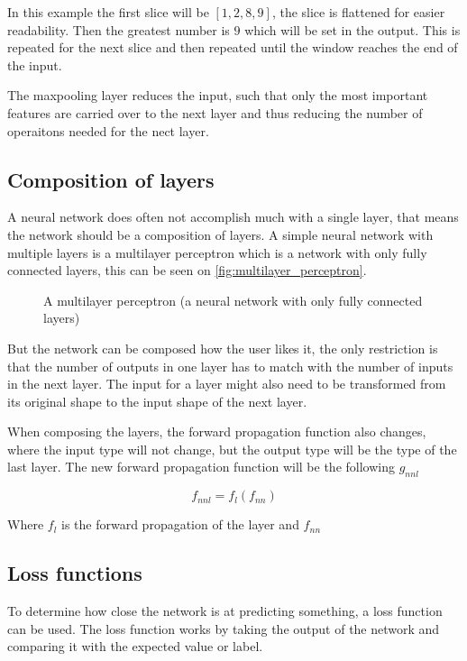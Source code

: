In this example the first slice will be $[1, 2, 8, 9]$, the slice is flattened for easier readability. Then the greatest number is $9$ which will be set in the output. This is repeated for the next slice and then repeated until the window reaches the end of the input.

The maxpooling layer reduces the input, such that only the most important features are carried over to the next layer and thus reducing the number of operaitons needed for the nect layer.

\subsection{Composition of layers}%
\label{sub:Composition}

A neural network does often not accomplish much with a single layer, that means the network should be a composition of layers. A simple neural network with multiple layers is a multilayer perceptron which is a network with only fully connected layers, this can be seen on \autoref{fig:multilayer_perceptron}.

\begin{figure}
    \caption{A multilayer perceptron (a neural network with only fully connected layers)}
    \label{fig:multilayer_perceptron}
\end{figure}

But the network can be composed how the user likes it, the only restriction is that the number of outputs in one layer has to match with the number of inputs in the next layer. The input for a layer might also need to be transformed from its original shape to the input shape of the next layer.

When composing the layers, the forward propagation function also changes, where the input type will not change, but the output type will be the type of the last layer.
The new forward propagation function will be the following $g_{nnl}$

$$f_{nnl} = f_l(f_{nn})$$

Where $f_l$ is the forward propagation of the layer and $f_{nn}$

\subsection{Loss functions}%
\label{sub:Loss functions}

To determine how close the network is at predicting something, a loss function can be used.
The loss function works by taking the output of the network and comparing it with the expected value or label.

